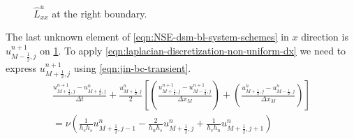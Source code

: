 \documentclass{article}
\begin{document}
\begin{figure}[H] %
  \caption{$\hat{L}^u_{xx}$ at the right boundary.}\label{fig:luxx-right}
\end{figure}
The last unknown element of \cref{eqn:NSE-dsm-bl-system-schemes} in $x$ direction is $u^{n+1}_{M-\frac{1}{2},j}$ on \cref{fig:luxx-right}. To apply \cref{eqn:laplacian-discretization-non-uniform-dx} we need to express $u^{n+1}_{M+\frac{1}{2},j}$ using \cref{eqn:jin-bc-transient}.
\begin{equation*}
\begin{gathered}
\frac{{u}^{n+1}_{M+\frac{1}{2},j}-{u}^n_{M+\frac{1}{2},j}}{\Delta t}
+\frac{u^n_{M+\frac{1}{2},j}}{2}
\left[
\left(
	\frac{u^{n+1}_{M+\frac{1}{2},j}-u^{n+1}_{M-\frac{1}{2},j}}{\Delta x_M}
\right)
+\left(
	\frac{u^{n}_{M+\frac{1}{2},j}-u^{n}_{M-\frac{1}{2},j}}{\Delta x_M}
\right)
\right] \\
=\nu\left(\frac{1}{h_c h_s}u^{n}_{M+\frac{1}{2},j-1} - \frac{2}{h_n h_s}u^{n}_{M+\frac{1}{2},j} + \frac{1}{h_c h_n}u^n_{M+\frac{1}{2},j+1}\right)
\end{gathered}
\end{equation*}
\end{document}
